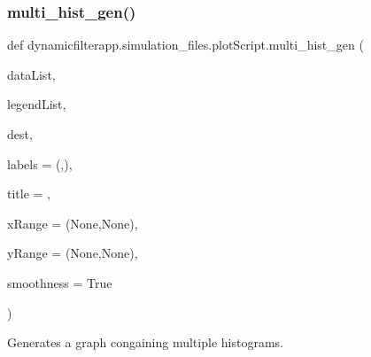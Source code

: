 \subsubsection{\texorpdfstring{multi\+\_\+hist\+\_\+gen()}{multi\_hist\_gen()}}
{\footnotesize\ttfamily def dynamicfilterapp.\+simulation\+\_\+files.\+plot\+Script.\+multi\+\_\+hist\+\_\+gen (\begin{DoxyParamCaption}\item[{}]{data\+List,  }\item[{}]{legend\+List,  }\item[{}]{dest,  }\item[{}]{labels = {\ttfamily (\textquotesingle{}\textquotesingle{},\textquotesingle{}\textquotesingle{})},  }\item[{}]{title = {\ttfamily \textquotesingle{}\textquotesingle{}},  }\item[{}]{x\+Range = {\ttfamily (None,None)},  }\item[{}]{y\+Range = {\ttfamily (None,None)},  }\item[{}]{smoothness = {\ttfamily True} }\end{DoxyParamCaption})}



Generates a graph congaining multiple histograms. 


